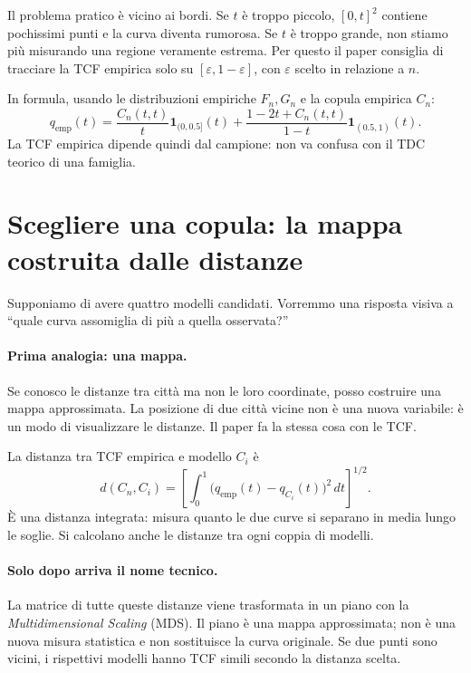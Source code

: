 \documentclass[11pt,a4paper]{article}
\begin{document}
Il problema pratico è vicino ai bordi. Se $t$ è troppo piccolo, $[0,t]^2$
contiene pochissimi punti e la curva diventa rumorosa. Se $t$ è troppo grande,
non stiamo più misurando una regione veramente estrema. Per questo il paper
consiglia di tracciare la TCF empirica solo su $[\varepsilon,1-\varepsilon]$,
con $\varepsilon$ scelto in relazione a $n$.

In formula, usando le distribuzioni empiriche $F_n,G_n$ e la copula empirica
$C_n$:
\begin{equation}
 q_{\mathrm{emp}}(t)=
 \frac{C_n(t,t)}{t}\mathbf{1}_{(0,0.5]}(t)+
 \frac{1-2t+C_n(t,t)}{1-t}\mathbf{1}_{(0.5,1)}(t).
 \label{eq:tcf-emp}
\end{equation}
La TCF empirica dipende quindi dal campione: non va confusa con il TDC
teorico di una famiglia.

\section{Scegliere una copula: la mappa costruita dalle distanze}

Supponiamo di avere quattro modelli candidati. Vorremmo una risposta visiva a
``quale curva assomiglia di più a quella osservata?''

\paragraph{Prima analogia: una mappa.} Se conosco le distanze tra città ma non
le loro coordinate, posso costruire una mappa approssimata. La posizione di due
città vicine non è una nuova variabile: è un modo di visualizzare le distanze.
Il paper fa la stessa cosa con le TCF.

La distanza tra TCF empirica e modello $C_i$ è
\begin{equation}
 d(C_n,C_i)=\left[\int_0^1
 \bigl(q_{\mathrm{emp}}(t)-q_{C_i}(t)\bigr)^2\,dt\right]^{1/2}.
 \label{eq:tcf-distance}
\end{equation}
È una distanza integrata: misura quanto le due curve si separano in media lungo
le soglie. Si calcolano anche le distanze tra ogni coppia di modelli.

\paragraph{Solo dopo arriva il nome tecnico.} La matrice di tutte queste
distanze viene trasformata in un piano con la \emph{Multidimensional Scaling}
(MDS). Il piano è una mappa approssimata; non è una nuova misura statistica e
non sostituisce la curva originale. Se due punti sono vicini, i rispettivi
modelli hanno TCF simili secondo la distanza scelta.
\end{document}
